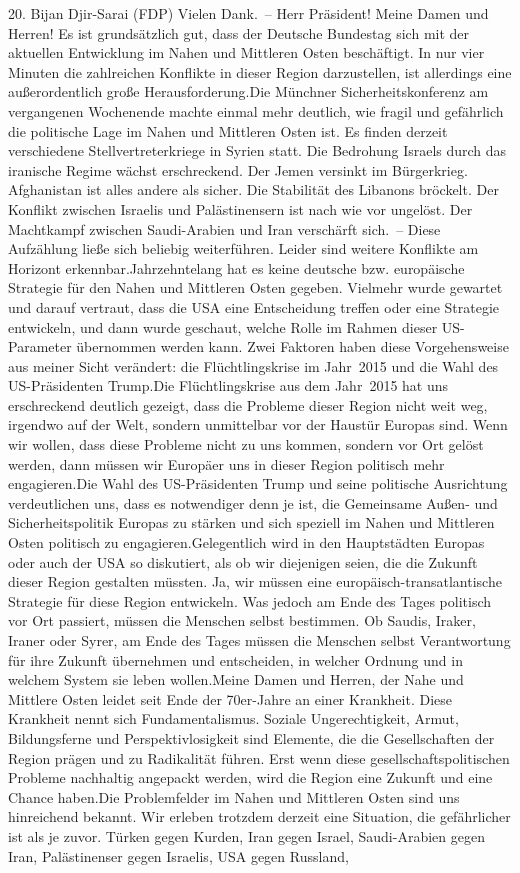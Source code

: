 \documentclass{article}
\begin{document}
	20. Bijan Djir-Sarai (FDP) Vielen Dank. – Herr Präsident! Meine Damen und Herren! Es ist grundsätzlich gut, dass der Deutsche Bundestag sich mit der aktuellen Entwicklung im Nahen und Mittleren Osten beschäftigt. In nur vier Minuten die zahlreichen Konflikte in dieser Region darzustellen, ist allerdings eine außerordentlich große Herausforderung.Die Münchner Sicherheitskonferenz am vergangenen Wochenende machte einmal mehr deutlich, wie fragil und gefährlich die politische Lage im Nahen und Mittleren Osten ist. Es finden derzeit verschiedene Stellvertreterkriege in Syrien statt. Die Bedrohung Israels durch das iranische Regime wächst erschreckend. Der Jemen versinkt im Bürgerkrieg. Afghanistan ist alles andere als sicher. Die Stabilität des Libanons bröckelt. Der Konflikt zwischen Israelis und Palästinensern ist nach wie vor ungelöst. Der Machtkampf zwischen Saudi-Arabien und Iran verschärft sich. – Diese Aufzählung ließe sich beliebig weiterführen. Leider sind weitere Konflikte am Horizont erkennbar.Jahrzehntelang hat es keine deutsche bzw. europäische Strategie für den Nahen und Mittleren Osten gegeben. Vielmehr wurde gewartet und darauf vertraut, dass die USA eine Entscheidung treffen oder eine Strategie entwickeln, und dann wurde geschaut, welche Rolle im Rahmen dieser US-Parameter übernommen werden kann. Zwei Faktoren haben diese Vorgehensweise aus meiner Sicht verändert: die Flüchtlingskrise im Jahr 2015 und die Wahl des US-Präsidenten Trump.Die Flüchtlingskrise aus dem Jahr 2015 hat uns erschreckend deutlich gezeigt, dass die Probleme dieser Region nicht weit weg, irgendwo auf der Welt, sondern unmittelbar vor der Haustür Europas sind. Wenn wir wollen, dass diese Probleme nicht zu uns kommen, sondern vor Ort gelöst werden, dann müssen wir Europäer uns in dieser Region politisch mehr engagieren.Die Wahl des US-Präsidenten Trump und seine politische Ausrichtung verdeutlichen uns, dass es notwendiger denn je ist, die Gemeinsame Außen- und Sicherheitspolitik Europas zu stärken und sich speziell im Nahen und Mittleren Osten politisch zu engagieren.Gelegentlich wird in den Hauptstädten Europas oder auch der USA so diskutiert, als ob wir diejenigen seien, die die Zukunft dieser Region gestalten müssten. Ja, wir müssen eine europäisch-transatlantische Strategie für diese Region entwickeln. Was jedoch am Ende des Tages politisch vor Ort passiert, müssen die Menschen selbst bestimmen. Ob Saudis, Iraker, Iraner oder Syrer, am Ende des Tages müssen die Menschen selbst Verantwortung für ihre Zukunft übernehmen und entscheiden, in welcher Ordnung und in welchem System sie leben wollen.Meine Damen und Herren, der Nahe und Mittlere Osten leidet seit Ende der 70er-Jahre an einer Krankheit. Diese Krankheit nennt sich Fundamentalismus. Soziale Ungerechtigkeit, Armut, Bildungsferne und Perspektivlosigkeit sind Elemente, die die Gesellschaften der Region prägen und zu Radikalität führen. Erst wenn diese gesellschaftspolitischen Probleme nachhaltig angepackt werden, wird die Region eine Zukunft und eine Chance haben.Die Problemfelder im Nahen und Mittleren Osten sind uns hinreichend bekannt. Wir erleben trotzdem derzeit eine Situation, die gefährlicher ist als je zuvor. Türken gegen Kurden, Iran gegen Israel, Saudi-Arabien gegen Iran, Palästinenser gegen Israelis, USA gegen Russland, 
\end{document}
